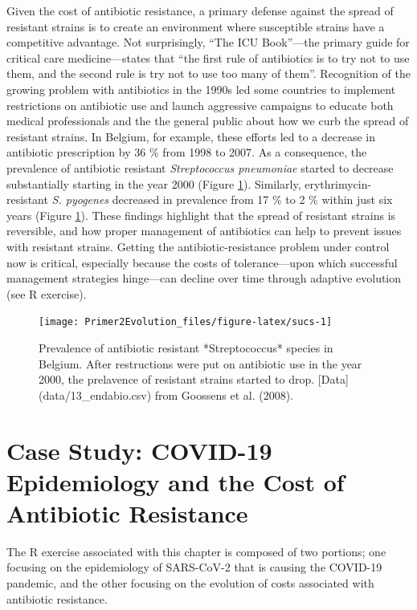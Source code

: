 \documentclass[
]{book}
\begin{document}
Given the cost of antibiotic resistance, a primary defense against the spread of resistant strains is to create an environment where susceptible strains have a competitive advantage. Not surprisingly, ``The ICU Book''---the primary guide for critical care medicine---states that ``the first rule of antibiotics is to try not to use them, and the second rule is try not to use too many of them''. Recognition of the growing problem with antibiotics in the 1990s led some countries to implement restrictions on antibiotic use and launch aggressive campaigns to educate both medical professionals and the the general public about how we curb the spread of resistant strains. In Belgium, for example, these efforts led to a decrease in antibiotic prescription by 36 \% from 1998 to 2007. As a consequence, the prevalence of antibiotic resistant \emph{Streptococcus pneumoniae} started to decrease substantially starting in the year 2000 (Figure \ref{fig:sucs}). Similarly, erythrimycin-resistant \emph{S. pyogenes} decreased in prevalence from 17 \% to 2 \% within just six years (Figure \ref{fig:sucs}). These findings highlight that the spread of resistant strains is reversible, and how proper management of antibiotics can help to prevent issues with resistant strains. Getting the antibiotic-resistance problem under control now is critical, especially because the costs of tolerance---upon which successful management strategies hinge---can decline over time through adaptive evolution (see R exercise).

\begin{figure}
\texttt{[image: Primer2Evolution\_files/figure-latex/sucs-1]} \caption{Prevalence of antibiotic resistant *Streptococcus* species in Belgium. After restructions were put on antibiotic use in the year 2000, the prelavence of resistant strains started to drop. [Data](data/13_endabio.csv) from Goossens et al. (2008).}\label{fig:sucs}
\end{figure}

\hypertarget{case-study-covid-19-epidemiology-and-the-cost-of-antibiotic-resistance}{%
\section{Case Study: COVID-19 Epidemiology and the Cost of Antibiotic Resistance}\label{case-study-covid-19-epidemiology-and-the-cost-of-antibiotic-resistance}}

The R exercise associated with this chapter is composed of two portions; one focusing on the epidemiology of SARS-CoV-2 that is causing the COVID-19 pandemic, and the other focusing on the evolution of costs associated with antibiotic resistance.
\end{document}
